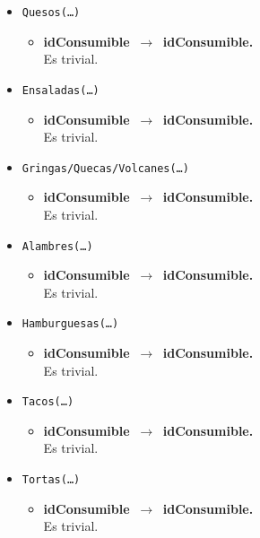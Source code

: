 \documentclass{article}
\newcommand{\flecha}{$\,\to\,$ }
\begin{document}
\begin{itemize}
\item \texttt{Quesos(\ldots)}
	\begin{itemize}
		\item \textbf{idConsumible \flecha idConsumible.}\\
		Es trivial.
	\end{itemize}

\item \texttt{Ensaladas(\ldots)}
	\begin{itemize}
		\item \textbf{idConsumible \flecha idConsumible.}\\
		Es trivial.
	\end{itemize}

\item \texttt{Gringas/Quecas/Volcanes(\ldots)}
	\begin{itemize}
		\item \textbf{idConsumible \flecha idConsumible.}\\
		Es trivial.
	\end{itemize}

\item \texttt{Alambres(\ldots)}
	\begin{itemize}
		\item \textbf{idConsumible \flecha idConsumible.}\\
		Es trivial.
	\end{itemize}

\item \texttt{Hamburguesas(\ldots)}
	\begin{itemize}
		\item \textbf{idConsumible \flecha idConsumible.}\\
		Es trivial.
	\end{itemize}

\item \texttt{Tacos(\ldots)}
	\begin{itemize}
		\item \textbf{idConsumible \flecha idConsumible.}\\
		Es trivial.
	\end{itemize}

\item \texttt{Tortas(\ldots)}
	\begin{itemize}
		\item \textbf{idConsumible \flecha idConsumible.}\\
		Es trivial.
	\end{itemize}


\end{itemize}
\end{document}
